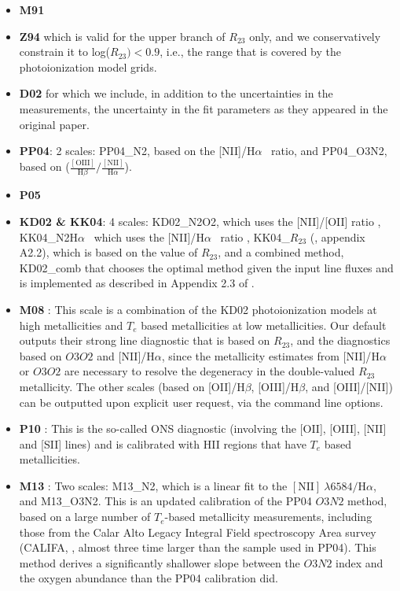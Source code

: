 \documentclass{emulateapj}
\newcommand{\ha}{\ensuremath{\mathrm{H}\alpha}}
\newcommand{\hb}{\ensuremath{\mathrm{H}\beta}}
\begin{document}
\begin{itemize}
\item {\bf M91} \citep{mcgaugh91}
\item {\bf Z94} \citep{zaritsky94} which is valid for the upper branch of $R_{23}$ only, and we conservatively constrain it to log($R_{23})<0.9$, i.e., the range that is covered by the photoionization model grids.
\item {\bf D02} \citep{denicolo02} for which we include, in addition to the uncertainties in the measurements, the uncertainty in the fit parameters as they appeared in the original paper.
\item {\bf PP04}:  \citep{pettini04} 2 scales:  PP04\_N2, based on the [NII]/\ha~ ratio, and PP04\_O3N2, based on  ($\frac{\mathrm{[OIII]}}{\mathrm{H}\beta}/\frac{\mathrm{[NII]}}{\mathrm{H}\alpha}$).  
\item {\bf P05} \citep{pilyugin05}
\item {\bf KD02 \& KK04}: 4 scales: KD02\_N2O2, which uses the [NII]/[OII] ratio \citep{kewley02}, KK04\_N2\ha~  which uses the [NII]/\ha~ ratio \citep{kobulnicky04}, KK04\_$R_{23}$ (\citealt{kewley08}, appendix A2.2), which is based on the value of $R_{23}$, and a combined method, KD02\_comb that chooses the optimal method given the input line fluxes and is implemented as described in Appendix 2.3 of \citet{kewley08}. 
\item {\bf M08} \citep{maiolino08}: This scale is a combination of the KD02 photoionization models at high metallicities and $T_e$ based metallicities at low metallicities. Our default outputs their strong line diagnostic that is based on $R_{23}$, and the diagnostics based on $O3O2$ and [NII]/\ha, since the metallicity estimates from  [NII]/\ha~ or $O3O2$ are necessary to resolve the degeneracy in the double-valued $R_{23}$ metallicity. The other scales (based on [OII]/\hb, [OIII]/\hb, and [OIII]/[NII]) can be outputted upon explicit user request, via the command line options. 
\item {\bf P10} \citep{pilyugin10}: This is the so-called ONS diagnostic (involving the [OII], [OIII], [NII] and [SII] lines) and is calibrated with HII regions that have $T_e$ based metallicities.
\item {\bf M13} \citep{marino13}: Two scales: M13\_N2, which is a linear fit to the $\mathrm{[NII]}~\lambda6584/\mathrm{H}\alpha$, and  M13\_O3N2. This is an updated calibration of the PP04 $O3N2$ method, based on a large number of $T_e$-based metallicity measurements, including those from the Calar Alto Legacy Integral Field spectroscopy Area survey (CALIFA, \citealt{sanchez12}, almost three time larger than the sample used in PP04). This method derives a significantly shallower slope between the $O3N2$ index and the oxygen abundance than the PP04 calibration did.

\end{itemize}
\end{document}
